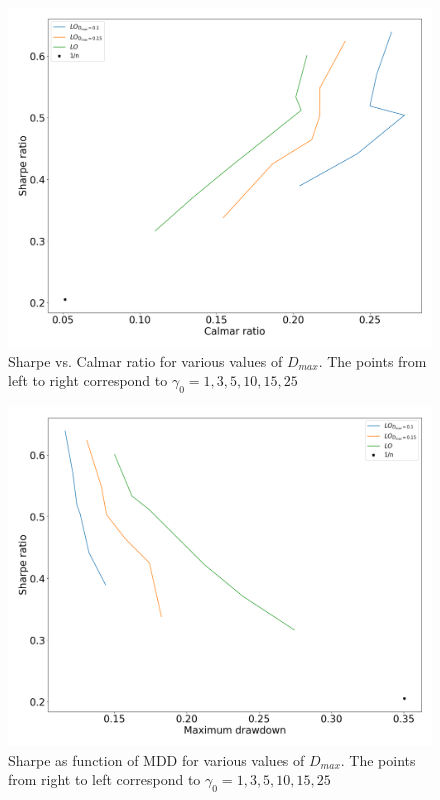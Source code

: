 \begin{figure}[H]
    \centering
    \includegraphics[width=1\textwidth]{analysis/portfolio_exercise/images/mle/sharpe_calmar_lo.png}
    \caption[Sharpe vs. Calmar ratio for various values of $D_{max}$]{Sharpe vs. Calmar ratio for various values of $D_{max}$. The points from left to right correspond to $\gamma_0=1,3,5,10,15,25$}
    \label{fig:MPC_sharpe_calmar_ls}
\end{figure}

\begin{figure}[H]
    \centering
    \includegraphics[width=1\textwidth]{analysis/portfolio_exercise/images/mle/sharpe_mdd_lo.png}
    \caption[Sharpe as function of MDD for various values of $D_{max}$]{Sharpe as function of MDD for various values of $D_{max}$. The points from right to left correspond to $\gamma_0=1,3,5,10,15,25$}
    \label{fig:MPC_sharpe_mdd_ls}
\end{figure}

